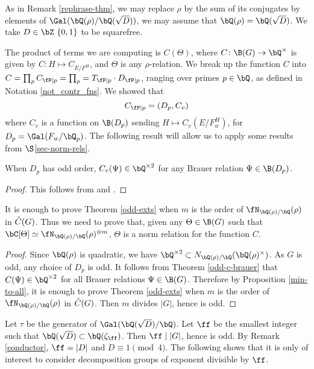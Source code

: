 As in Remark \ref{rephrase-thm}, we may replace $\rho$ by the sum of its conjugates by elements of $ \Gal(\bQ(\rho) / \bQ(\sqrt{D}))$, we may assume that $\bQ(\rho) = \bQ(\sqrt{D})$. We take $D \in \bZ \ \{0,1 \}$ to be squarefree.

The product of terms we are computing is $C(\Theta)$, where $C \colon \B(G) \to \bQ^{\times}$ is given by $C \colon H \mapsto C_{E / F^H}$, and $\Theta$ is any $\rho$-relation.
We break up the function $C$ into $C = \prod_p C_{\fP \mid p} = \prod_p = T_{\fP \mid p} \cdot D_{\fP \mid p}$, ranging over primes $p \in \bQ$,
as defined in Notation \ref{not_contr_fns}.
We showed that
\begin{equation*}\label{Dp-loc}
C_{\fP \mid p} = (D_p, C_v)
\end{equation*}
where $C_v$ is a function on $\B(D_p)$ sending $H \mapsto C_v(E / F_w^H)$, for $D_p = \Gal(F_w / \bQ_p)$. The following result will allow us to apply some results from $\S$\ref{sec-norm-rels}.

\begin{thm}\label{odd-c-brauer}
    When $D_p$ has odd order, $C_v(\Psi) \in \bQ^{\times 2}$ for any Brauer relation $\Psi \in \B(D_p)$. 
\end{thm}

\begin{proof}
    This follows from \cite[Theorem 2.47]{reg-const} and \cite[Theorem 3.2  (Tam)]{reg-const}.
\end{proof}

\begin{cor}
It is enough to prove Theorem \ref{odd-exts} when $m$ is the order of $\repnorm{\rho}$ in $\hat{C}(G)$. Thus we need to prove that, given any $
\Theta \in \B(G)$ such that $\bC[\Theta] \simeq \repnorm{\rho}^{\oplus m}$, $\Theta$ is a norm relation for the function $C$. 
\end{cor}

\begin{proof}
    Since $\bQ(\rho)$ is quadratic, we have $\bQ^{\times 2} \subset \fieldnorm{\rho}$. As $G$ is odd, any choice of $D_p$ is odd. It follows from Theorem \ref{odd-c-brauer} that $C(\Psi) \in \bQ^{\times 2}$ for all Brauer relations $\Psi \in \B(G)$. Therefore by Proposition \ref{min-to-all}, it is enough to prove Theorem \ref{odd-exts} when $m$ is the order of $\repnorm{\rho}$ in $\hat{C}(G)$. Then $m$ divides $|G|$, hence is odd.
\end{proof}

Let $\tau$ be the generator of $\Gal(\bQ(\sqrt{D}) / \bQ)$.
Let $\ff$ be the smallest integer such that $\bQ(\sqrt{D}) \subset \bQ(\zeta_{\ff})$. Then $\ff \mid |G|$, hence is odd. By Remark \ref{conductor}, $\ff = |D|$ and $D \equiv 1 \pmod 4$. The following shows that it is only of interest to consider decomposition groups of exponent divisible by $\ff$.


